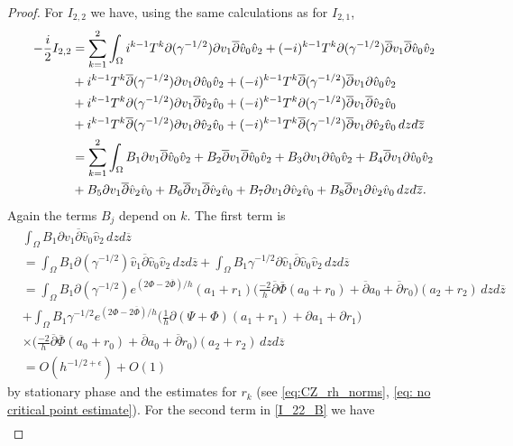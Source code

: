 \documentclass[a4paper, 10pt, twoside, notitlepage]{amsart}
\theoremstyle{plain}
\newcommand{\Om}{\Omega}
\numberwithin{equation}{section}
\newcommand {\p} {\partial}
\newcommand{\e}{\epsilon}
\newcommand{\dbar}{\ol{\p}}
\newcommand{\ol}[1]{\overline{#1}}
\newcommand{\oz}{\overline{z}}
\begin{document}
\begin{proof}
	For $I_{2,2}$ we have, using the same calculations as for $I_{2,1}$,
	\begin{align}\label{I_22_B}
		-\frac{i}{2}I_{2,2} &= \sum_{k=1}^2\int_{\Om} i^{k-1}T^k\p(\gamma^{-1/2})\p v_1\dbar \hat{v}_0\hat{v}_2 + (-i)^{k-1}T^k\p(\gamma^{-1/2})\dbar v_1\dbar \hat{v}_0\hat{v}_2\\\notag
		&+ i^{k-1}T^k\dbar(\gamma^{-1/2})\p v_1\p \hat{v}_0 \hat{v}_2 + (-i)^{k-1} T^k\dbar(\gamma^{-1/2})\dbar v_1\p \hat{v}_0 \hat{v}_2\\\notag
		&+ i^{k-1}T^k\p(\gamma^{-1/2})\p v_1 \dbar \hat{v}_2 \hat{v}_0 + (-i)^{k-1}T^k\p(\gamma^{-1/2})\dbar v_1\dbar \hat{v}_2 \hat{v}_0\\\notag
		&+ i^{k-1}T^k\dbar(\gamma^{-1/2})\p v_1\p \hat{v}_2\hat{v}_0 + (-i)^{k-1}T^k\dbar(\gamma^{-1/2})\dbar v_1 \p \hat{v}_2\hat{v}_0\,dzd\oz\\\notag
		&= \sum_{k=1}^2\int_{\Om} B_1\p v_1 \dbar \hat{v}_0\hat{v}_2 + B_2\dbar v_1\dbar \hat{v}_0\hat{v}_2 + B_3\p v_1\p \hat{v}_0\hat{v}_2 + B_4\dbar v_1\p \hat{v}_0\hat{v}_2\\\notag
		&+ B_5\p v_1 \dbar \hat{v}_2\hat{v}_0 + B_6\dbar v_1\dbar \hat{v}_2\hat{v}_0 + B_7\p v_1\p \hat{v}_2\hat{v}_0 + B_8\dbar v_1\p \hat{v}_2\hat{v}_0\,dzd\oz.
	\end{align}
	Again the terms $B_j$ depend on $k$. The first term is
	\begin{align*}
		&\int_{\Om} B_1\p v_1\dbar \hat{v}_0 \hat{v}_2\,dzd\oz\\
		&= \int_{\Om}B_1\p(\gamma^{-1/2})\hat{v}_1\dbar \hat{v}_0\hat{v}_2\,dzd\oz + \int_{\Om} B_1\gamma^{-1/2}\p \hat{v}_1\dbar \hat{v}_0 \hat{v}_2\,dzd\oz\\
		&= \int_{\Om}B_1\p(\gamma^{-1/2})e^{(2\Phi - 2\ol{\Phi})/h}(a_1+r_1)\Big(\frac{-2}{h}\dbar\ol{\Phi}(a_0+r_0) + \dbar a_0 + \dbar r_0\Big)(a_2 + r_2)\,dzd\oz\\
		&+ \int_{\Om}B_1\gamma^{-1/2}e^{(2\Phi - 2\ol{\Phi})/h}\Big(\frac{1}{h}\p(\Psi + \Phi)(a_1 + r_1) + \p a_1 + \p r_1\Big)\\
		&\times \Big(\frac{-2}{h}\dbar\ol{\Phi}(a_0+r_0) + \dbar a_0 + \dbar r_0\Big)(a_2 + r_2)\,dzd\oz\\
		&= O(h^{-1/2+\e}) + O(1)
	\end{align*}
	by stationary phase and the estimates for $r_k$ (see \eqref{eq:CZ_rh_norms}, \eqref{eq: no critical point estimate}). For the second term in \eqref{I_22_B} we have
	\begin{align*}

\end{align*}
\end{proof}
\end{document}
